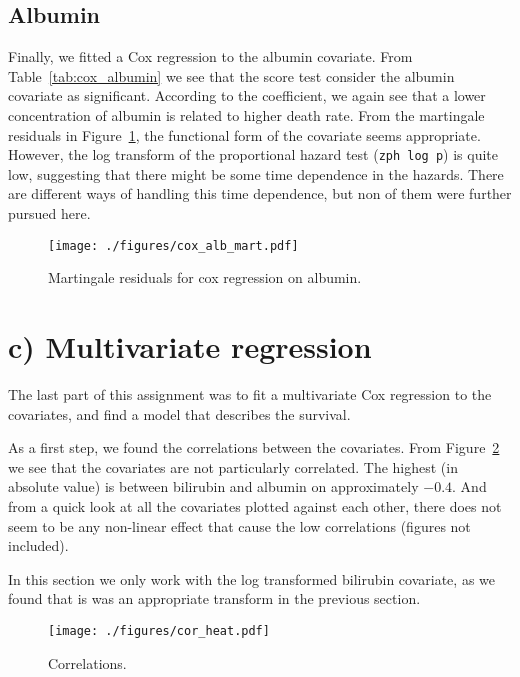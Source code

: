 \documentclass[11pt,a4paper]{article}
\begin{document}


\subsection{Albumin}

Finally, we fitted a Cox regression to the albumin covariate. From Table~\ref{tab:cox_albumin} we see that the score test consider the albumin covariate as significant.
According to the coefficient, we again see that a lower concentration of albumin is related to higher death rate.
From the martingale residuals in Figure~\ref{fig:cox_alb_mart}, the functional form of the covariate seems appropriate. 
However, the log transform of the proportional hazard test (\verb+zph log p+) is quite low, suggesting that there might be some time dependence in the hazards.
There are different ways of handling this time dependence, but non of them were further pursued here.



\begin{figure}[h!tb]
    \begin{center}
        \texttt{[image: ./figures/cox\_alb\_mart.pdf]}
    \end{center}
    \vspace{-0.2cm}
    \caption{Martingale residuals for cox regression on albumin.}
    \label{fig:cox_alb_mart}
\end{figure}



\section{c) Multivariate regression}

The last part of this assignment was to fit a multivariate Cox regression to the covariates, and find a model that describes the survival.

As a first step, we found the correlations between the covariates. From Figure~\ref{fig:cor_heat} we see that the covariates are not particularly correlated. The highest (in absolute value) is between bilirubin and albumin on approximately $-0.4$. And from a quick look at all the covariates plotted against each other, there does not seem to be any non-linear effect that cause the low correlations (figures not included).

In this section we only work with the log transformed bilirubin covariate, as we found that is was an appropriate transform in the previous section.
%
\begin{figure}[h!tb]
    \begin{center}
        \texttt{[image: ./figures/cor\_heat.pdf]}
    \end{center}
    \vspace{-0.8cm}
    \caption{Correlations.}
    \label{fig:cor_heat}
\end{figure}
\end{document}
